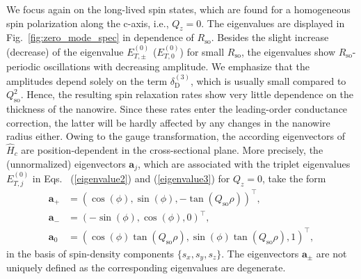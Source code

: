 \documentclass[superscriptaddress,noshowpacs,noshowkeys, twocolumn, floatfix,aps, prb,reprint]{revtex4-1}
\begin{document}
We focus again on the long-lived spin states, which are found for a homogeneous spin polarization along the c-axis, i.e., $Q_z=0$.
The eigenvalues are displayed in Fig.~\ref{fig:zero_mode_spec}  in dependence of $R_\text{so}$.
Besides the slight increase (decrease) of the eigenvalue $E^{(0)}_{T,\pm}$  ($E^{(0)}_{T,0}$) for small $R_\text{so}$, the eigenvalues show $R_\text{so}$-periodic oscillations with decreasing amplitude.
We emphasize that the amplitudes depend solely on the term $\delta_\text{D}^{(3)}$, which is usually small compared to $Q_\text{so}^2$.
Hence, the resulting spin relaxation rates show very little dependence on the thickness of the nanowire.
Since these rates enter the leading-order conductance correction, the latter will be hardly affected by any changes in the nanowire radius either.
Owing to the gauge transformation, the according eigenvectors of $\hat{H}_c$ are position-dependent in the cross-sectional plane.
More precisely, the (unnormalized) eigenvectors $\mathbf{a}_j$, which are associated with the triplet eigenvalues $E^{(0)}_{T,j}$ in Eqs.~ (\ref{eigenvalue2}) and (\ref{eigenvalue3})  for $Q_z=0$, take the form
%
\begin{align}
\mathbf{a}_+&={}(\cos(\phi),\sin(\phi),-\tan(Q_\text{so}\rho))^\top,\\
\mathbf{a}_-&={}(-\sin(\phi),\cos(\phi),0)^\top,\\
\mathbf{a}_0&={}(\cos(\phi)\tan(Q_\text{so}\rho),\sin(\phi)\tan(Q_\text{so}\rho),1)^\top,
\end{align}
%
in the basis of spin-density components $\{s_x,s_y,s_z\}$.
The eigenvectors $\mathbf{a}_\pm$ are not uniquely defined as the corresponding eigenvalues are degenerate.
\end{document}
